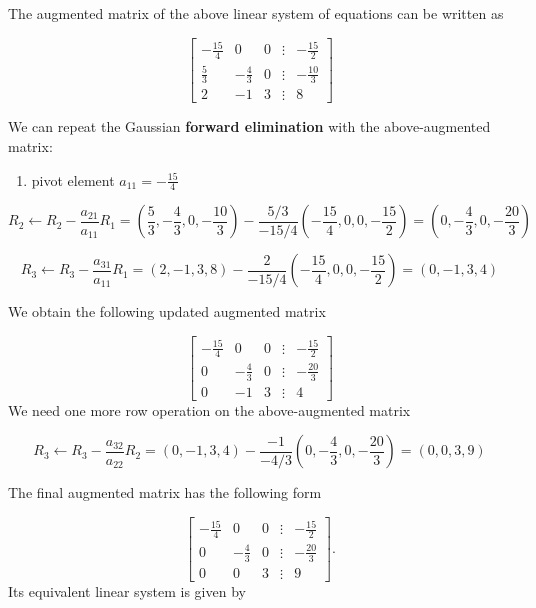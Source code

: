 \documentclass[
]{book}
\providecommand{\tightlist}{%
  \setlength{\itemsep}{0pt}\setlength{\parskip}{0pt}}
\begin{document}
The augmented matrix of the above linear system of equations can be written as

\[
\left[
\begin{array}{ccccc}
 -\frac{15}{4} & 0 &  0 &\vdots & -\frac{15}{2}\\ 
 \frac{5}{3} & -\frac{4}{3} &  0 &\vdots & -\frac{10}{3} \\ 
 2 &  -1 & 3 & \vdots & 8
\end{array}
\right]
\]

We can repeat the Gaussian \textbf{forward elimination} with the above-augmented matrix:

\begin{enumerate}
\def\labelenumi{\arabic{enumi}.}
\tightlist
\item
  pivot element \(a_{11} = -\frac{15}{4}\)
\end{enumerate}

\[
R_2 \leftarrow R_2-\frac{a_{21}}{a_{11}}R_1 = \left(\frac{5}{3}, -\frac{4}{3},0, -\frac{10}{3} \right)-\frac{5/3}{-15/4}\left(-\frac{15}{4}, 0, 0, -\frac{15}{2} \right) =\left(0, -\frac{4}{3}, 0, -\frac{20}{3} \right)
\]

\[
R_3 \leftarrow R_3 - \frac{a_{31}}{a_{11}}R_1 = \left(2,-1,3,8 \right) - \frac{2}{-15/4}\left(-\frac{15}{4}, 0, 0, -\frac{15}{2} \right) = \left(0,-1, 3, 4 \right)
\]

We obtain the following updated augmented matrix

\[
\left[
\begin{array}{ccccc}
 -\frac{15}{4} & 0 &  0 &\vdots & -\frac{15}{2}\\ 
 0 & -\frac{4}{3} &  0 &\vdots & -\frac{20}{3} \\ 
 0 &  -1 & 3 & \vdots & 4
\end{array}
\right]
\]
We need one more row operation on the above-augmented matrix

\[
R_3 \leftarrow R_3 - \frac{a_{32}}{a_{22}}R_2 = \left(0, -1, 3, 4 \right) - \frac{-1}{-4/3}\left(0, -\frac{4}{3}, 0, -\frac{20}{3} \right) = \left(0, 0, 3, 9 \right)
\]

The final augmented matrix has the following form

\[
\left[
\begin{array}{ccccc}
 -\frac{15}{4} & 0 &  0 &\vdots & -\frac{15}{2}\\ 
 0 & -\frac{4}{3} &  0 &\vdots & -\frac{20}{3} \\ 
 0 &  0 & 3 & \vdots & 9
\end{array}
\right].
\]
Its equivalent linear system is given by
\end{document}
